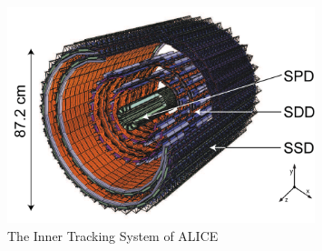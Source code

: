 \begin{figure}[t]
\centering
\includegraphics[width=0.8\textwidth]{Images/Chapter3/its}
\caption[Inner Tracking System]{The Inner Tracking System of ALICE}
\label{Fig:cap3-1.4}
\end{figure}

